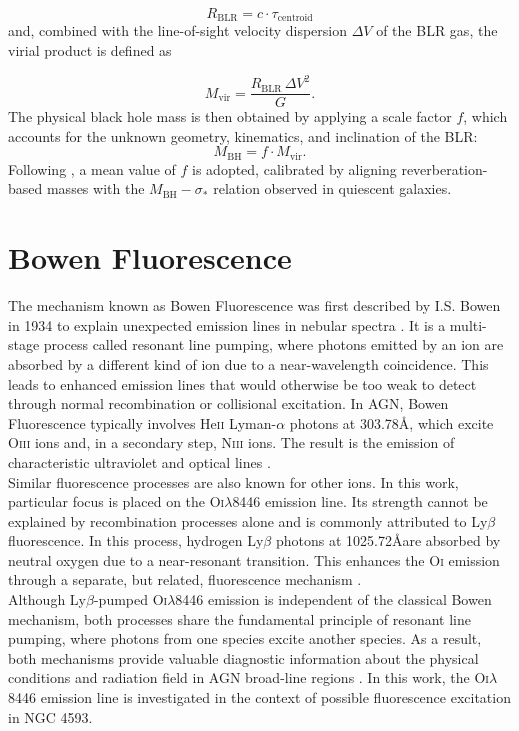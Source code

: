 \begin{equation}
	R_{\mathrm{BLR}} = c \cdot \tau_{\mathrm{centroid}}
\end{equation}
and, combined with the line-of-sight velocity dispersion $\Delta V$ of the BLR gas, the virial product is defined as

\begin{equation}
	M_{\mathrm{vir}} = \frac{R_{\mathrm{BLR}}\,\Delta V^2}{G}.
\end{equation}
The physical black hole mass is then obtained by applying a scale factor $f$, which accounts for the unknown geometry, kinematics, and inclination of the BLR:
\begin{equation}
	M_{\mathrm{BH}} = f \cdot M_{\mathrm{vir}}.
\end{equation}
Following \textcite{onken2004}, a mean value of $f$ is adopted, calibrated by aligning reverberation-based masses with the $M_{\mathrm{BH}}-\sigma_*$ relation observed in quiescent galaxies. 



\section{Bowen Fluorescence}
\label{sec:bowen_fluorescence}

The mechanism known as Bowen Fluorescence was first described by I.S. Bowen in 1934 to explain unexpected emission lines in nebular spectra \parencite{bowen1934}. It is a multi-stage process called resonant line pumping, where photons emitted by an ion are absorbed by a different kind of ion due to a near-wavelength coincidence. This leads to enhanced emission lines that would otherwise be too weak to detect through normal recombination or collisional excitation. In AGN, Bowen Fluorescence typically involves He\textsc{ii} Lyman-$\alpha$ photons at 303.78\AA, which excite O\textsc{iii} ions and, in a secondary step, N\textsc{iii} ions. The result is the emission of characteristic ultraviolet and optical lines \parencite{selvelli2007, baldini2023}.\\
Similar fluorescence processes are also known for other ions. In this work, particular focus is placed on the O\textsc{i}$\lambda$8446 emission line. Its strength cannot be explained by recombination processes alone and is commonly attributed to Ly$\beta$ fluorescence. In this process, hydrogen Ly$\beta$ photons at 1025.72\AA are absorbed by neutral oxygen due to a near-resonant transition. This enhances the O\textsc{i} emission through a separate, but related, fluorescence mechanism \parencite{grandi1980}.\\
Although Ly$\beta$-pumped O\textsc{i}$\lambda$8446 emission is independent of the classical Bowen mechanism, both processes share the fundamental principle of resonant line pumping, where photons from one species excite another species. As a result, both mechanisms provide valuable diagnostic information about the physical conditions and radiation field in AGN broad-line regions \parencite{grandi1980, selvelli2007}. In this work, the O\textsc{i}$\lambda$8446 emission line is investigated in the context of possible fluorescence excitation in NGC 4593.





